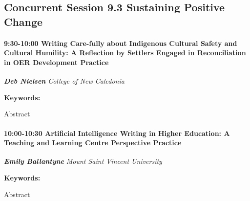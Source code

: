 \documentclass[
]{book}
\begin{document}
\hypertarget{concurrent-session-9.3-sustaining-positive-change}{%
\subsection*{Concurrent Session 9.3 \textbar{} Sustaining Positive Change}\label{concurrent-session-9.3-sustaining-positive-change}}

\begin{session}
\hypertarget{writing-care-fully-about-indigenous-cultural-safety-and-cultural-humility-a-reflection-by-settlers-engaged-in-reconciliation-in-oer-development-practice}{%
\paragraph*{\texorpdfstring{9:30-10:00 \textbar{} \textbf{Writing
Care-fully about Indigenous Cultural Safety and Cultural Humility: A
Reflection by Settlers Engaged in Reconciliation in OER Development}
\textbar{}
Practice}{9:30-10:00 \textbar{} Writing Care-fully about Indigenous Cultural Safety and Cultural Humility: A Reflection by Settlers Engaged in Reconciliation in OER Development \textbar{} Practice}}\label{writing-care-fully-about-indigenous-cultural-safety-and-cultural-humility-a-reflection-by-settlers-engaged-in-reconciliation-in-oer-development-practice}}

\textbf{\emph{Deb Nielsen}} \textbar{} \emph{College of New Caledonia}

\textbf{Keywords:}

Abstract
\end{session}
\begin{session}
\hypertarget{artificial-intelligence-writing-in-higher-education-a-teaching-and-learning-centre-perspective-practice}{%
\paragraph*{\texorpdfstring{10:00-10:30 \textbar{} \textbf{Artificial
Intelligence Writing in Higher Education: A Teaching and Learning Centre
Perspective} \textbar{}
Practice}{10:00-10:30 \textbar{} Artificial Intelligence Writing in Higher Education: A Teaching and Learning Centre Perspective \textbar{} Practice}}\label{artificial-intelligence-writing-in-higher-education-a-teaching-and-learning-centre-perspective-practice}}

\textbf{\emph{Emily Ballantyne}} \textbar{} \emph{Mount Saint Vincent
University}

\textbf{Keywords:}

Abstract
\end{session}
\end{document}
